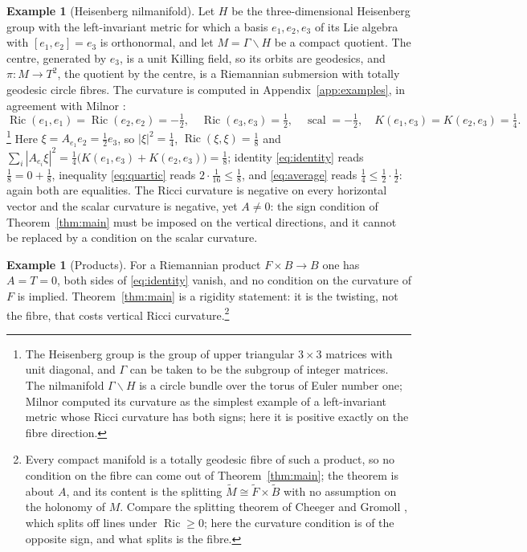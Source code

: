 \documentclass[11pt,reqno]{amsart}
\theoremstyle{plain}
\theoremstyle{definition}
\newtheorem{example}[theorem]{Example}
\newcommand{\Ric}{\operatorname{Ric}}
\newcommand{\scal}{\operatorname{scal}}
\newcommand{\bas}[1]{\widetilde{#1}}
\begin{document}
\begin{example}[Heisenberg nilmanifold]\label{ex:heisenberg}
Let $H$ be the three-dimensional Heisenberg group with the left-invariant metric for which a basis $e_1,e_2,e_3$ of its Lie algebra with $[e_1,e_2]=e_3$ is orthonormal, and let $M=\Gamma\backslash H$ be a compact quotient. The centre, generated by $e_3$, is a unit Killing field, so its orbits are geodesics, and $\pi\colon M\to T^2$, the quotient by the centre, is a Riemannian submersion with totally geodesic circle fibres. The curvature is computed in Appendix~\ref{app:examples}, in agreement with Milnor \cite{Milnor1976}:
\begin{equation}\label{eq:heis}
\Ric(e_1,e_1)=\Ric(e_2,e_2)=-\tfrac12,\quad\Ric(e_3,e_3)=\tfrac12,\quad \scal=-\tfrac12,\quad K(e_1,e_3)=K(e_2,e_3)=\tfrac14 .
\end{equation}\footnote{The Heisenberg group is the group of upper triangular $3\times3$ matrices with unit diagonal, and $\Gamma$ can be taken to be the subgroup of integer matrices. The nilmanifold $\Gamma\backslash H$ is a circle bundle over the torus of Euler number one; Milnor \cite{Milnor1976} computed its curvature as the simplest example of a left-invariant metric whose Ricci curvature has both signs; here it is positive exactly on the fibre direction.}
Here $\xi=A_{e_1}e_2=\tfrac12e_3$, so $|\xi|^2=\tfrac14$, $\Ric(\xi,\xi)=\tfrac18$ and $\sum_i|A_{e_i}\xi|^2=\tfrac14\bigl(K(e_1,e_3)+K(e_2,e_3)\bigr)=\tfrac18$; identity \eqref{eq:identity} reads $\tfrac18=0+\tfrac18$, inequality \eqref{eq:quartic} reads $2\cdot\tfrac1{16}\le\tfrac18$, and \eqref{eq:average} reads $\tfrac14\le\tfrac12\cdot\tfrac12$: again both are equalities. The Ricci curvature is negative on every horizontal vector and the scalar curvature is negative, yet $A\neq0$: the sign condition of Theorem~\ref{thm:main} must be imposed on the vertical directions, and it cannot be replaced by a condition on the scalar curvature.
\end{example}

\begin{example}[Products]
For a Riemannian product $F\times B\to B$ one has $A=T=0$, both sides of \eqref{eq:identity} vanish, and no condition on the curvature of $F$ is implied. Theorem~\ref{thm:main} is a rigidity statement: it is the twisting, not the fibre, that costs vertical Ricci curvature.\footnote{Every compact manifold is a totally geodesic fibre of such a product, so no condition on the fibre can come out of Theorem~\ref{thm:main}; the theorem is about $A$, and its content is the splitting $\bas M\cong\bas F\times\bas B$ with no assumption on the holonomy of $M$. Compare the splitting theorem of Cheeger and Gromoll \cite{CheegerGromoll1971}, which splits off lines under $\Ric\ge0$; here the curvature condition is of the opposite sign, and what splits is the fibre.}
\end{example}
\end{document}
